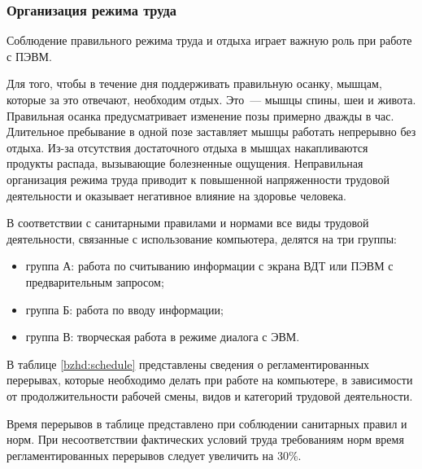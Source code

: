 \subsubsection{Организация режима труда}
Соблюдение правильного режима труда и отдыха играет важную роль при работе с  ПЭВМ.

Для того, чтобы в течение дня поддерживать  правильную осанку, мышцам, которые за это отвечают, необходим отдых. Это~--- мышцы спины, шеи и живота. Правильная осанка предусматривает изменение позы примерно дважды в час. Длительное пребывание в одной позе заставляет мышцы работать непрерывно без отдыха. Из-за отсутствия достаточного отдыха в мышцах накапливаются продукты распада, вызывающие болезненные ощущения. Неправильная организация режима труда приводит к повышенной напряженности трудовой деятельности и оказывает негативное влияние на здоровье человека.

В соответствии с санитарными правилами и нормами  все виды трудовой деятельности, связанные с использование компьютера, делятся на три группы:
\begin{itemize}
\item группа А: работа по считыванию информации с экрана ВДТ или ПЭВМ с предварительным запросом;
\item группа Б: работа по вводу информации;
\item группа В: творческая работа в режиме диалога с ЭВМ.
\end{itemize}

В таблице \ref{bzhd:schedule} представлены сведения о регламентированных перерывах, которые необходимо делать при работе на компьютере, в зависимости от продолжительности рабочей смены, видов и категорий трудовой деятельности.

Время перерывов в таблице представлено при соблюдении санитарных правил и норм. При несоответствии фактических условий труда требованиям норм время регламентированных перерывов следует увеличить на 30\%.

